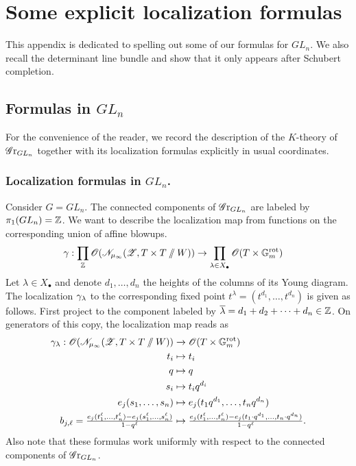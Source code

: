 \section{Some explicit localization formulas}\label{appendix: some explicit formulas in type A}
This appendix is dedicated to spelling out some of our formulas for $GL_n$. We also recall the determinant line bundle and show that it only appears after Schubert completion.

\subsection{Formulas in \texorpdfstring{$GL_n$}{GLn}}
For the convenience of the reader, we record the description of the $K$-theory of $\operatorname{\mathscr{G}r}_{GL_n}$ together with its localization formulas explicitly in usual coordinates.


\subsubsection{Localization formulas in \texorpdfstring{$GL_n$}{GLn}.}\label{equation: localization formulas in GLn}
Consider $G = GL_n$. The connected components of $\operatorname{\mathscr{G}r}_{GL_n}$ are labeled by $\pi_1(GL_n) = \operatorname{\mathbb{Z}}$.
We want to describe the localization map from functions on the corresponding union of affine blowups.
\begin{align*}
  \gamma:  \prod_{\operatorname{\mathbb{Z}}} \operatorname{\mathscr{O}}(\mathscr{N}_{\mu_{\infty}}(\operatorname{\mathscr{Z}}, T \times T \sslash W)) &\to \prod_{\lambda \in X_{\bullet}} \operatorname{\mathscr{O}}(T \times \mathbb{G}_m^{\mathrm{rot}})
\end{align*}
Let $\lambda \in X_{\bullet}$ and denote $d_1, \dots, d_n$ the heights of the columns of its Young diagram. The localization $\gamma_{\lambda}$ to the corresponding fixed point $t^{\lambda} = (t^{d_1}, \dots, t^{d_n})$ is given as follows. First project to the component labeled by $\overline{\lambda} = d_1 + d_2 + \dots + d_n \in \operatorname{\mathbb{Z}}$. On generators of this copy, the localization map reads as
\begin{align*}
   \gamma_{\lambda}: \operatorname{\mathscr{O}}(\mathscr{N}_{\mu_{\infty}}(\operatorname{\mathscr{Z}}, T \times T \sslash W)) & \xrightarrow{} \operatorname{\mathscr{O}}(T \times \mathbb{G}_m^{\mathrm{rot}}) \\
    t_i &\mapsto t_i \\
    q &\mapsto q \\
    s_i &\mapsto t_i q^{d_i} \\    
    e_j(s_1, \dots, s_n) &\mapsto e_j(t_1 q^{d_1}, \dots, t_n q^{d_n}) \\
    b_{j, \ell} = \tfrac{e_j(t^{\ell}_1, \dots, t^{\ell}_n) - e_j(s^{\ell}_1, \dots, s^{\ell}_n)}{1-q^{\ell}} &\mapsto \tfrac{e_j(t^{\ell}_1, \dots, t^{\ell}_n) - e_j(t_1 \cdot q^{d_1}, \dots, t_n \cdot q^{d_n})}{1-q^{\ell}}.
\end{align*}
Also note that these formulas work uniformly with respect to the connected components of $\operatorname{\mathscr{G}r}_{GL_n}$.




